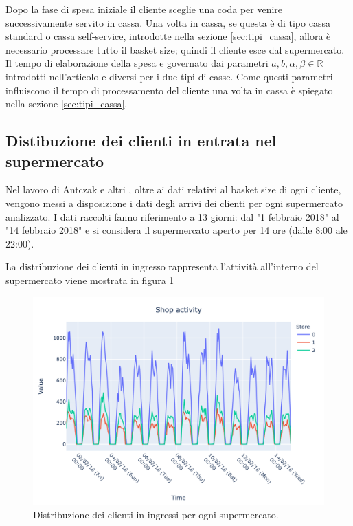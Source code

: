 Dopo la fase di spesa iniziale il cliente sceglie una coda per venire successivamente servito in cassa. Una volta in cassa, se questa è di tipo cassa standard o cassa self-service, introdotte nella sezione \ref{sec:tipi_cassa}, allora è necessario processare tutto il basket size; quindi il cliente esce dal supermercato.  Il tempo di elaborazione della spesa e governato dai parametri $a,b,\alpha ,\beta \in \mathbb{R}$  introdotti nell'articolo \cite{article1} e diversi per i due tipi di casse. Come questi parametri influiscono il tempo di processamento del cliente una volta in cassa è spiegato nella sezione \ref{sec:tipi_cassa}.

\subsection{Distibuzione dei clienti in entrata nel supermercato}
Nel lavoro di Antczak e altri \cite{article1}, oltre ai dati relativi al basket size di ogni cliente, vengono messi a disposizione i dati degli arrivi dei clienti per ogni supermercato analizzato. I dati raccolti fanno riferimento a 13 giorni: dal "1 febbraio 2018" al "14 febbraio 2018" e si considera il supermercato aperto per  14 ore (dalle 8:00 ale 22:00).

La distribuzione dei clienti in ingresso rappresenta l'attività all'interno del supermercato viene mostrata in figura \ref{fig:shop_activity}
 
 
\begin{figure}[H]
	\centering
	\includegraphics[width=14cm]{"images/shop_activity.png"}
	\caption{Distribuzione dei clienti in ingressi per ogni supermercato.}
	\label{fig:shop_activity}
\end{figure}

